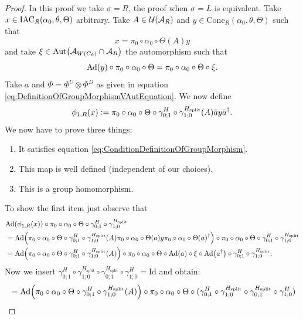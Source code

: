 \documentclass[12pt,a4paper,twoside]{article}
\numberwithin{equation}{section}
\begin{document}
\begin{proof}
	In this proof we take $\sigma=R$, the proof when $\sigma=L$ is equivalent. Take $x\in \textrm{IAC}_R(\alpha_0,\theta,\Theta)$ arbitrary. Take $A\in\mathcal U(\mathcal A_R)$ and $y\in\textrm{Cone}_R(\alpha_0,\theta,\Theta)$ such that
	\begin{equation}
	x=\pi_0\circ\alpha_0\circ\Theta(A)y
	\end{equation}
	and take $\xi\in\Aut{\AA_{W(C_\theta)}\cap \AA_R}$ the automorphism such that
	\begin{equation}
	\Ad{y}\circ\pi_0\circ\alpha_0\circ\Theta=\pi_0\circ\alpha_0\circ\Theta\circ\xi.
	\end{equation}
	Take $a$ and $\Phi=\Phi^U\otimes\Phi^D$ as given in equation \eqref{eq:DefinitionOfGroupMorphismVAutEquation}. We now define
	\begin{equation}
		\phi_{1,R}(x)\vcentcolon= \pi_0\circ\alpha_0\circ\Theta\circ\gamma^H_{0;1}\circ\gamma^{H_\text{split}}_{1;0}(A)\tilde{a}y\tilde{a}^\dagger.
	\end{equation}
	We now have to prove three things:
	\begin{enumerate}
		\item It satisfies equation \eqref{eq:ConditionDefinitionOfGroupMorphism}.
		\item This map is well defined (independent of our choices).
		\item This is a group homomorphism.
	\end{enumerate}
	To show the first item just observe that
	\begin{align}
		&\Ad{\phi_{1,R}(x)}\circ\pi_0\circ\alpha_0\circ\Theta\circ\gamma^H_{0;1}\circ\gamma^{H_\text{split}}_{1;0}\\
		&=\Ad{\pi_0\circ\alpha_0\circ\Theta\circ\gamma^H_{0;1}\circ\gamma^{H_\text{split}}_{1;0}(A)\pi_0\circ\alpha_0\circ\Theta(a)y\pi_0\circ\alpha_0\circ\Theta(a)^\dagger}\circ\pi_0\circ\alpha_0\circ\Theta\circ\gamma^H_{0;1}\circ\gamma^{H_\text{split}}_{1;0}\\
		&=\Ad{\pi_0\circ\alpha_0\circ\Theta\circ\gamma^H_{0;1}\circ\gamma^{H_\text{split}}_{1;0}(A)}\circ\pi_0\circ\alpha_0\circ\Theta\circ\Ad{a}\circ\xi\circ\Ad{a^\dagger}\circ\gamma^H_{0;1}\circ\gamma^{H_\text{split}}_{1;0}.
	\end{align}
	Now we insert $\gamma^H_{0;1}\circ\gamma^{H_\text{split}}_{1;0}\circ\gamma^{H_\text{split}}_{0;1}\circ\gamma^H_{1;0}=\text{Id}$ and obtain:
	\begin{align}
		&=\Ad{\pi_0\circ\alpha_0\circ\Theta\circ\gamma^H_{0;1}\circ\gamma^{H_\text{split}}_{1;0}(A)}\circ\pi_0\circ\alpha_0\circ\Theta\circ(\gamma^H_{0;1}\circ\gamma^{H_\text{split}}_{1;0}\circ\gamma^{H_\text{split}}_{0;1}\circ\gamma^H_{1;0})\\

\end{align}
\end{proof}
\end{document}

